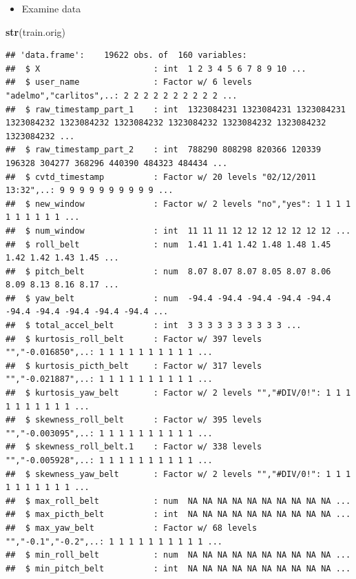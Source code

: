 \documentclass[]{article}
\newenvironment{Shaded}{\begin{snugshade}}{\end{snugshade}}
\newcommand{\KeywordTok}[1]{\textcolor[rgb]{0.13,0.29,0.53}{\textbf{{#1}}}}
\newcommand{\NormalTok}[1]{{#1}}
\begin{document}
\begin{itemize}
\itemsep1pt\parskip0pt
\item
  Examine data
\end{itemize}

\begin{Shaded}
\begin{Highlighting}[]
\KeywordTok{str}\NormalTok{(train.orig)}
\end{Highlighting}
\end{Shaded}

\begin{verbatim}
## 'data.frame':    19622 obs. of  160 variables:
##  $ X                       : int  1 2 3 4 5 6 7 8 9 10 ...
##  $ user_name               : Factor w/ 6 levels "adelmo","carlitos",..: 2 2 2 2 2 2 2 2 2 2 ...
##  $ raw_timestamp_part_1    : int  1323084231 1323084231 1323084231 1323084232 1323084232 1323084232 1323084232 1323084232 1323084232 1323084232 ...
##  $ raw_timestamp_part_2    : int  788290 808298 820366 120339 196328 304277 368296 440390 484323 484434 ...
##  $ cvtd_timestamp          : Factor w/ 20 levels "02/12/2011 13:32",..: 9 9 9 9 9 9 9 9 9 9 ...
##  $ new_window              : Factor w/ 2 levels "no","yes": 1 1 1 1 1 1 1 1 1 1 ...
##  $ num_window              : int  11 11 11 12 12 12 12 12 12 12 ...
##  $ roll_belt               : num  1.41 1.41 1.42 1.48 1.48 1.45 1.42 1.42 1.43 1.45 ...
##  $ pitch_belt              : num  8.07 8.07 8.07 8.05 8.07 8.06 8.09 8.13 8.16 8.17 ...
##  $ yaw_belt                : num  -94.4 -94.4 -94.4 -94.4 -94.4 -94.4 -94.4 -94.4 -94.4 -94.4 ...
##  $ total_accel_belt        : int  3 3 3 3 3 3 3 3 3 3 ...
##  $ kurtosis_roll_belt      : Factor w/ 397 levels "","-0.016850",..: 1 1 1 1 1 1 1 1 1 1 ...
##  $ kurtosis_picth_belt     : Factor w/ 317 levels "","-0.021887",..: 1 1 1 1 1 1 1 1 1 1 ...
##  $ kurtosis_yaw_belt       : Factor w/ 2 levels "","#DIV/0!": 1 1 1 1 1 1 1 1 1 1 ...
##  $ skewness_roll_belt      : Factor w/ 395 levels "","-0.003095",..: 1 1 1 1 1 1 1 1 1 1 ...
##  $ skewness_roll_belt.1    : Factor w/ 338 levels "","-0.005928",..: 1 1 1 1 1 1 1 1 1 1 ...
##  $ skewness_yaw_belt       : Factor w/ 2 levels "","#DIV/0!": 1 1 1 1 1 1 1 1 1 1 ...
##  $ max_roll_belt           : num  NA NA NA NA NA NA NA NA NA NA ...
##  $ max_picth_belt          : int  NA NA NA NA NA NA NA NA NA NA ...
##  $ max_yaw_belt            : Factor w/ 68 levels "","-0.1","-0.2",..: 1 1 1 1 1 1 1 1 1 1 ...
##  $ min_roll_belt           : num  NA NA NA NA NA NA NA NA NA NA ...
##  $ min_pitch_belt          : int  NA NA NA NA NA NA NA NA NA NA ...

\end{verbatim}
\end{document}
